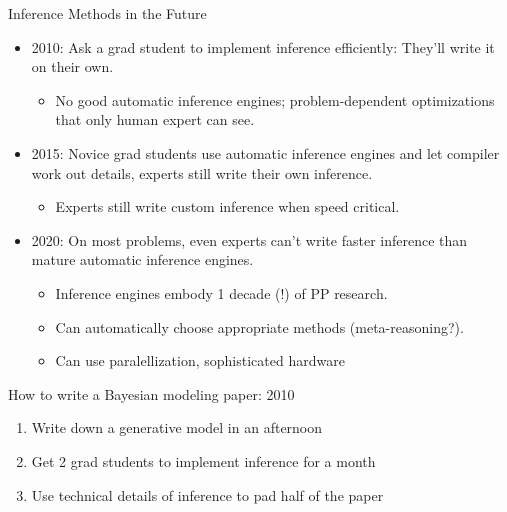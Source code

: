 \begin{frame}{Inference Methods in the Future}
  \begin{itemize}
    \item 2010: Ask a grad student to implement inference efficiently:  They'll write it on their own.
    \begin{itemize}
      \item No good automatic inference engines; problem-dependent optimizations that only human expert can see.
    \end{itemize}
    \vspace{\baselineskip}
    \item 2015: Novice grad students use automatic inference engines and let compiler work out details, experts still write their own inference.
    \begin{itemize}
      \item Experts still write custom inference when speed critical.
    \end{itemize}
    \vspace{\baselineskip}
    \item 2020: On most problems, even experts can't write faster inference than mature automatic inference engines.
    \begin{itemize}
      \item Inference engines embody 1 decade (!) of PP research.
      \item Can automatically choose appropriate methods (meta-reasoning?).
      \item Can use paralellization, sophisticated hardware
    \end{itemize}    
    \vspace{\baselineskip}
  \end{itemize}
\end{frame}


\begin{frame}{How to write a Bayesian modeling paper: 2010}
  \begin{block}{}
    \begin{enumerate}
      \item Write down a generative model in an afternoon
      \vspace{\baselineskip}
      \vspace{\baselineskip}
      \item Get 2 grad students to implement inference for a month
      \vspace{\baselineskip}
      \vspace{\baselineskip}
      \item Use technical details of inference to pad half of the paper
    \end{enumerate}
  \end{block}
\end{frame}

